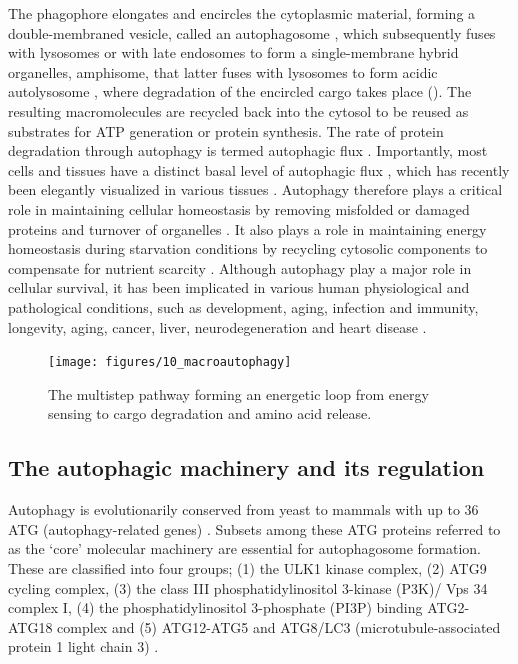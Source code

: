 The phagophore elongates and encircles the cytoplasmic material, forming a double-membraned vesicle, called an autophagosome \citep{Cai2012,Levine2008}, which subsequently fuses with lysosomes or with late endosomes to form a single-membrane hybrid organelles, amphisome, that latter fuses with lysosomes to form acidic autolysosome \citep{Cai2012,Nixon2011,sarkar2013}, where degradation of the encircled cargo takes place (). The resulting macromolecules are recycled back into the cytosol to be reused as substrates for ATP generation or protein synthesis. The rate of protein degradation through autophagy is termed autophagic flux \citep{klionsky2016,loos2014}. Importantly, most cells and tissues have a distinct basal level of autophagic flux \citep{Mizushima2004a}, which has recently been elegantly visualized in various tissues \citep{Kaizuka2016}. Autophagy therefore plays a critical role in maintaining cellular homeostasis by removing misfolded or damaged proteins and turnover of organelles \citep{Levine2008}. It also plays a role in maintaining energy homeostasis during starvation conditions by recycling cytosolic components to compensate for nutrient scarcity \citep{Levine2008,Loos2009}. Although autophagy play a major role in cellular survival, it has been implicated in various human physiological and pathological conditions, such as development, aging, infection and immunity, longevity, aging, cancer, liver, neurodegeneration and heart disease \citep{Meijer2006,Mizushima2008,Ravikumar2010b,sarkar2013}.

\begin{figure}[!htbp]
  \texttt{[image: figures/10\_macroautophagy]}
  \caption{The multistep pathway forming an energetic loop from energy sensing to cargo degradation and amino acid release.}
  \label{fig:10_macroautophagy}
\end{figure}

\subsection{The autophagic machinery and its regulation}
Autophagy is evolutionarily conserved from yeast to mammals with up to 36 ATG (autophagy-related genes) \citep{Thumm1994,Tsukada1993,Klionsky2007,Mizushima2010}. Subsets among these ATG proteins referred to as the ‘core’ molecular machinery are essential for autophagosome formation. These are classified into four groups; (1) the ULK1 kinase complex, (2) ATG9 cycling complex, (3) the class III phosphatidylinositol 3-kinase (P3K)/ Vps 34 complex I, (4) the phosphatidylinositol 3-phosphate (PI3P) binding ATG2-ATG18 complex and (5) ATG12-ATG5 and ATG8/LC3 (microtubule-associated protein 1 light chain 3) \citep{Feng2014,Yang2010}.

